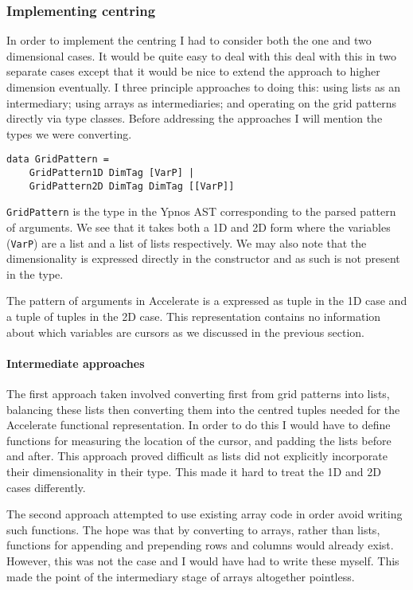 \subsubsection{Implementing centring}

In order to implement the centring I had to consider both the one and
two dimensional cases. It would be quite easy to deal with this deal
with this in two separate cases except that it would be nice to extend
the approach to higher dimension eventually. I three principle
approaches to doing this: using lists as an intermediary; using arrays
as intermediaries; and operating on the grid patterns directly via type
classes. Before addressing the approaches I will mention the types we
were converting.

\begin{verbatim}
data GridPattern =
    GridPattern1D DimTag [VarP] |
    GridPattern2D DimTag DimTag [[VarP]]
\end{verbatim}

\texttt{GridPattern} is the type in the Ypnos AST corresponding to the
parsed pattern of arguments. We see that it takes both a 1D and 2D form
where the variables (\texttt{VarP}) are a list and a list of lists
respectively. We may also note that the dimensionality is expressed
directly in the constructor and as such is not present in the type.

The pattern of arguments in Accelerate is a expressed as tuple in the 1D
case and a tuple of tuples in the 2D case. This representation contains
no information about which variables are cursors as we discussed in the
previous section.

\paragraph{Intermediate approaches}

The first approach taken involved converting first from grid patterns
into lists, balancing these lists then converting them into the centred
tuples needed for the Accelerate functional representation. In order to
do this I would have to define functions for measuring the location of
the cursor, and padding the lists before and after. This approach proved
difficult as lists did not explicitly incorporate their dimensionality
in their type. This made it hard to treat the 1D and 2D cases
differently.

The second approach attempted to use existing array code in order avoid
writing such functions. The hope was that by converting to arrays,
rather than lists, functions for appending and prepending rows and
columns would already exist. However, this was not the case and I would
have had to write these myself. This made the point of the intermediary
stage of arrays altogether pointless.

